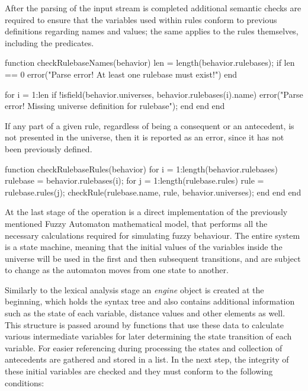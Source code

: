 After the parsing of the input stream is completed additional semantic checks are required to ensure that the variables used within rules conform to previous definitions regarding names and values; the same applies to the rules themselves, including the predicates.

\begin{octave}
function checkRulebaseNames(behavior)
  len = length(behavior.rulebases);
  if len == 0
    error("Parse error! At least one rulebase must exist!\n")
  end

  for i = 1:len
    if !isfield(behavior.universes, behavior.rulebases(i).name)
      error("Parse error! Missing universe definition for rulebase\n");
    end
  end
end
\end{octave}

If any part of a given rule, regardless of being a consequent or an antecedent, is not presented in the universe, then it is reported as an error, since it has not been previously defined.
\begin{octave}
function checkRulebaseRules(behavior)
  for i = 1:length(behavior.rulebases)
    rulebase = behavior.rulebases(i);
    for j = 1:length(rulebase.rules)
      rule = rulebase.rules(j);
      checkRule(rulebase.name, rule, behavior.universes);
    end
  end
end
\end{octave}

At the last stage of the operation is a direct implementation of the previously mentioned Fuzzy Automaton mathematical model, that performs all the necessary calculations required for simulating fuzzy behaviour. The entire system is a state machine, meaning that the initial values of the variables inside the universe will be used in the first and then subsequent transitions, and are subject to change as the automaton moves from one state to another.

Similarly to the lexical analysis stage an \textit{engine} object is created at the beginning, which holds the syntax tree and also contains additional information such as the state of each variable, distance values and other elements as well. This structure is passed around by functions that use these data to calculate various intermediate variables for later determining the state transition of each variable. For easier referencing during processing the states and collection of antecedents are gathered and stored in a list. In the next step, the integrity of these initial variables are checked and they must conform to the following conditions:

